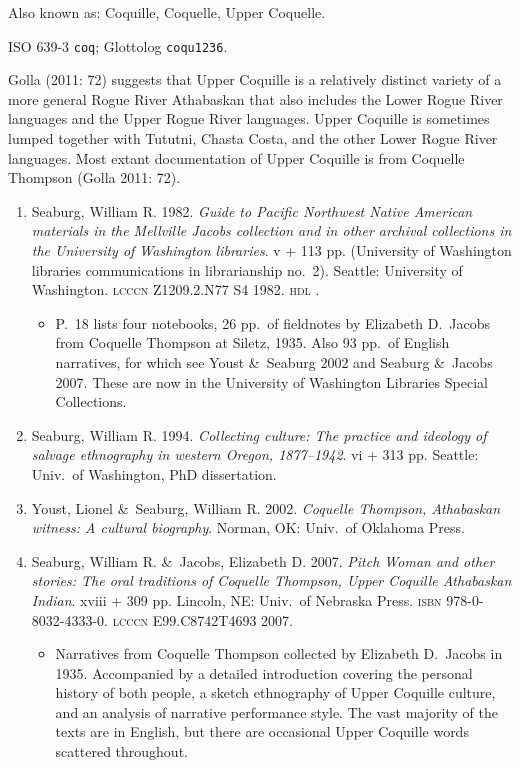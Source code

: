 \documentclass[12pt,letterpaper,oneside,article]{memoir}
\begin{document}
Also known as: Coquille, Coquelle, Upper Coquelle.

ISO 639-3 \texttt{coq}; Glottolog \texttt{coqu1236}.

Golla (2011: 72) suggests that Upper Coquille is a relatively distinct variety of a more general Rogue River Athabaskan that also includes the Lower Rogue River languages and the Upper Rogue River languages.
Upper Coquille is sometimes lumped together with Tututni, Chasta Costa, and the other Lower Rogue River languages.
Most extant documentation of Upper Coquille is from Coquelle Thompson (Golla 2011: 72).

\begin{enumerate}
\item	Seaburg, William R.
	1982.
	\textit{Guide to Pacific Northwest Native American materials in the Mellville Jacobs
		collection and in other archival collections in the University of Washington
		libraries}.
	v + 113 pp.
	(University of Washington libraries communications in librarianship no.\ 2).
	Seattle: University of Washington.
	\textsc{lcccn} Z1209.2.N77 S4 1982.
	\textsc{hdl} .
	\begin{itemize}
	\item	P.\ 18 lists four notebooks, 26 pp.\ of fieldnotes by Elizabeth D.\ Jacobs
		from Coquelle Thompson at Siletz, 1935.
		Also 93 pp.\ of English narratives, for which see Youst \&\ Seaburg 2002
		and Seaburg \&\ Jacobs 2007.
		These are now in the University of Washington Libraries Special Collections.
	\end{itemize}
\item	Seaburg, William R.
	1994.
	\textit{Collecting culture: The practice and ideology of salvage ethnography in
		western Oregon, 1877–1942}.
	vi + 313 pp.
	Seattle: Univ.\ of Washington, PhD dissertation.
\item	Youst, Lionel \&\ Seaburg, William R.
	2002.
	\textit{Coquelle Thompson, Athabaskan witness: A cultural biography}.
	Norman, OK: Univ.\ of Oklahoma Press.
\item	Seaburg, William R. \&\ Jacobs, Elizabeth D.
	2007.
	\textit{Pitch Woman and other stories: The oral traditions of Coquelle Thompson,
		Upper Coquille Athabaskan Indian}.
	xviii + 309 pp.
	Lincoln, NE: Univ.\ of Nebraska Press.
	\textsc{isbn} 978-0-8032-4333-0.
	\textsc{lcccn} E99.C8742T4693 2007.
	\begin{itemize}
	\item	Narratives from Coquelle Thompson collected by Elizabeth D.\ Jacobs in 1935.
		Accompanied by a detailed introduction covering the personal history of both
		people, a sketch ethnography of Upper Coquille culture, and an analysis of
		narrative performance style.
		The vast majority of the texts are in English, but there are occasional
		Upper Coquille words scattered throughout.
	\end{itemize}
\end{enumerate}
\end{document}
